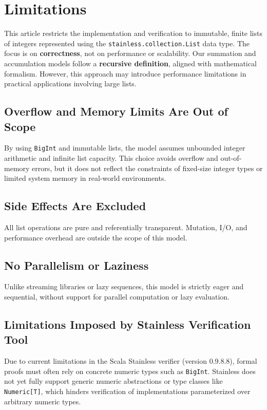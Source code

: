 \section{Limitations}
\label{sec:limitations}

This article restricts the implementation and verification to immutable,
finite lists of integers represented using the
\texttt{stainless.collection.List} data type. The focus is on
\textbf{correctness}, not on performance or scalability. Our summation
and accumulation models follow a \textbf{recursive definition}, aligned
with mathematical formalism. However, this approach may introduce
performance limitations in practical applications involving large lists.

\subsection{Overflow and Memory Limits Are Out of Scope}

By using \texttt{BigInt} and immutable lists, the model assumes
unbounded integer arithmetic and infinite list capacity. This choice
avoids overflow and out-of-memory errors, but it does not reflect the
constraints of fixed-size integer types or limited system memory in
real-world environments.

\subsection{Side Effects Are Excluded}

All list operations are pure and referentially transparent. Mutation,
I/O, and performance overhead are outside the scope of this model.

\subsection{No Parallelism or Laziness}

Unlike streaming libraries or lazy sequences, this model is strictly
eager and sequential, without support for parallel computation or lazy
evaluation.

\subsection{Limitations Imposed by Stainless Verification Tool}

Due to current limitations in the Scala Stainless verifier (version
0.9.8.8), formal proofs must often rely on concrete numeric types such as
\texttt{BigInt}. Stainless does not yet fully support generic numeric
abstractions or type classes like \texttt{Numeric[T]}, which hinders
verification of implementations parameterized over arbitrary numeric
types.

